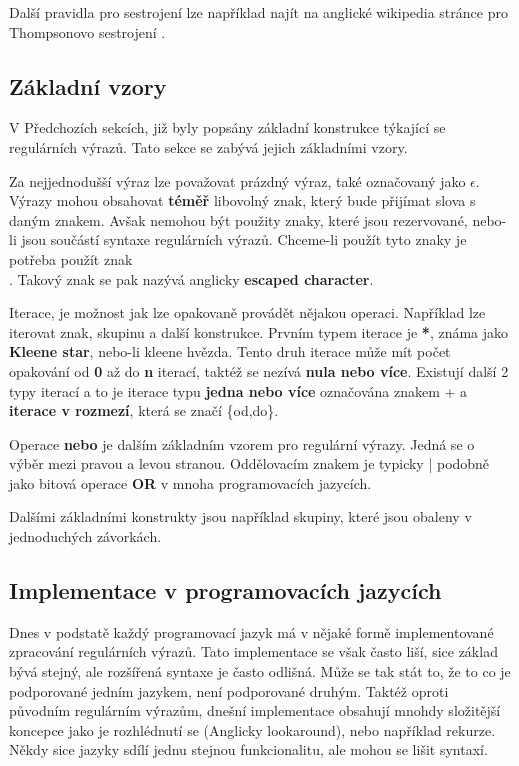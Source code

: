 Další pravidla pro sestrojení lze například najít na anglické wikipedia stránce pro Thompsonovo sestrojení \cite{Wikipedia_2023}.

\subsection*{Základní vzory}
V Předchozích sekcích, již byly popsány základní konstrukce týkající se regulárních výrazů.
Tato sekce se zabývá jejich základními vzory.

Za nejjednodušší výraz lze považovat prázdný výraz, také označovaný jako $\epsilon$. 
Výrazy mohou obsahovat \textbf{téměř} libovolný znak, který bude přijímat slova s daným znakem. 
Avšak nemohou být použity znaky, které jsou rezervované, nebo-li jsou součástí syntaxe regulárních výrazů.
Chceme-li použít tyto znaky je potřeba použít znak \textbf{\\}. 
Takový znak se pak nazývá anglicky \textbf{escaped character}.

Iterace, je možnost jak lze opakovaně provádět nějakou operaci.
Například lze iterovat znak, skupinu a další konstrukce.
Prvním typem iterace je \textbf{*}, známa jako \textbf{Kleene star}, nebo-li kleene hvězda.
Tento druh iterace může mít počet opakování od \textbf{0} až do \textbf{n} iterací, taktéž se nezívá \textbf{nula nebo více}. 
Existují další 2 typy iterací a to je iterace typu \textbf{jedna nebo více} označována znakem + a \textbf{iterace v rozmezí}, která se značí \{od,do\}.

Operace \textbf{nebo} je dalším základním vzorem pro regulární výrazy. 
Jedná se o výběr mezi pravou a levou stranou. Oddělovacím znakem je typicky | podobně jako bitová operace \textbf{OR} v mnoha programovacích jazycích.

Dalšími základními konstrukty jsou například skupiny, které jsou obaleny v jednoduchých závorkách. 

\subsection*{Implementace v programovacích jazycích}\label{sec:impipl}

Dnes v podstatě každý programovací jazyk má v nějaké formě implementované zpracování regulárních výrazů.
Tato implementace se však často liší, sice základ bývá stejný, ale rozšířená syntaxe je často odlišná.
Může se tak stát to, že to co je podporované jedním jazykem, není podporované druhým.
Taktéž oproti původním regulárním výrazům, dnešní implementace obsahují mnohdy složitější
koncepce jako je rozhlédnutí se (Anglicky lookaround), nebo například rekurze.
Někdy sice jazyky sdílí jednu stejnou funkcionalitu, ale mohou se lišit syntaxí.

